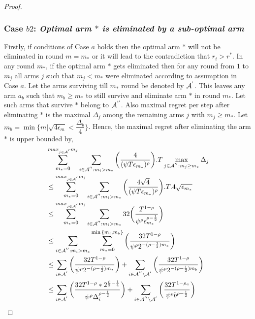 \begin{proof}
\subsubsection*{Case $b2$: \textit{Optimal arm ${*}$ is eliminated by a sub-optimal arm  }}


	Firstly, if conditions of Case $a$ holds then the optimal arm ${*}$ will not be eliminated in round $m=m_{*}$ or it will lead to the contradiction that $r_{i}>r^{*}$. In any round $m_{*}$, if the optimal arm ${*}$ gets eliminated then for any round from $1$ to $m_{j}$ all arms ${j}$ such that $m_{j}< m_{*}$ were eliminated according to assumption in Case $a$. Let the arms surviving till $m_{*}$ round be denoted by $\mathcal{A}^{'}$. This leaves any arm $a_{b}$ such that $m_{b}\geq m_{*}$ to still survive and eliminate arm ${*}$ in round $m_{*}$. Let such arms that survive ${*}$ belong to $\mathcal{A}^{''}$. Also maximal regret per step after eliminating ${*}$ is the maximal $\Delta_{j}$ among the remaining arms ${j}$ with $m_{j}\geq m_{*}$.  Let $m_{b}=\min\lbrace m|\sqrt{4\epsilon_{m}}<\dfrac{\Delta_{b}}{4}\rbrace$. Hence, the maximal regret after eliminating the arm ${*}$ is upper bounded by, 
\begin{align*}
&\sum_{m_{*}=0}^{max_{j\in \A^{'}}m_{j}}\sum_{i\in \A^{''}:m_{i}>m_{*}}\bigg(\dfrac{4}{(\psi  T\epsilon_{m_{*}})^{\rho}} \bigg).T\max_{j\in \A^{''}:m_{j}\geq m_{*}}{\Delta}_{j}\\
&\leq\sum_{m_{*}=0}^{max_{j\in \A^{'}}m_{j}}\sum_{i\in \A^{''}:m_{i}>m_{*}}\bigg(\dfrac{4\sqrt{4}}{(\psi  T\epsilon_{m_{*}})^{\rho}} \bigg).T.4\sqrt{\epsilon_{m_{*}}}\\
&\leq\sum_{m_{*}=0}^{max_{j\in \A^{'}}m_{j}}\sum_{i\in \A^{''}:m_{i}>m_{*}}32\bigg(\dfrac{T^{1-\rho}}{\psi^{\rho}\epsilon_{m_{*}}^{\rho-\frac{1}{2}}} \bigg)\\
&\leq\sum_{i\in \A^{''}:m_{i}>m_{*}}\sum_{m_{*}=0}^{\min{\lbrace m_{i},m_{b}\rbrace}}\bigg(\dfrac{32T^{1-\rho}}{\psi^{\rho}2^{-(\rho -\frac{1}{2})m_{*}}} \bigg)\\
&\leq\sum_{i\in \A^{'}}\bigg(\dfrac{32T^{1-\rho}}{\psi^{\rho}2^{-(\rho -\frac{1}{2})m_{*}}} \bigg)+\sum_{i\in \A^{''}\setminus \A^{'}}\bigg(\dfrac{32T^{1-\rho }}{\psi^{\rho}2^{-(\rho -\frac{1}{2})m_{b}}} \bigg)\\
&\leq\sum_{i\in \A^{'}}\bigg(\dfrac{32T^{1-\rho}*2^{\frac{\rho}{2}-\frac{1}{4}}}{\psi^{\rho}\Delta_{i}^{\rho -\frac{1}{2}}} \bigg)+\sum_{i\in \A^{''}\setminus \A^{'}}\bigg(\dfrac{32T^{1-\rho_{a}}}{\psi^{\rho}b^{\rho -\frac{1}{2}}} \bigg)\\

\end{align*}
\end{proof}
